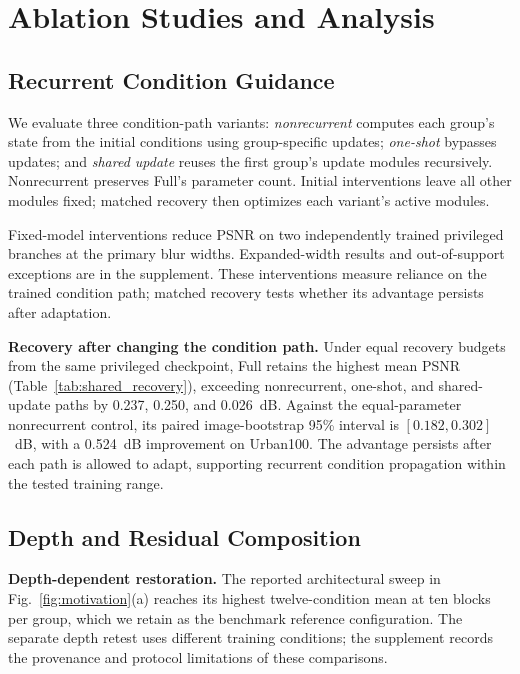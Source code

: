 \documentclass[10pt,journal,letterpaper]{IEEEtran}
\begin{document}
\section{Ablation Studies and Analysis}
\subsection{Recurrent Condition Guidance}
We evaluate three condition-path variants: \emph{nonrecurrent} computes each group's state from the initial conditions using group-specific updates; \emph{one-shot} bypasses updates; and \emph{shared update} reuses the first group's update modules recursively. Nonrecurrent preserves Full's parameter count. Initial interventions leave all other modules fixed; matched recovery then optimizes each variant's active modules.

Fixed-model interventions reduce PSNR on two independently trained privileged branches at the primary blur widths. Expanded-width results and out-of-support exceptions are in the supplement. These interventions measure reliance on the trained condition path; matched recovery tests whether its advantage persists after adaptation.

\noindent\textbf{Recovery after changing the condition path.}
Under equal recovery budgets from the same privileged checkpoint, Full retains the highest mean PSNR (Table~\ref{tab:shared_recovery}), exceeding nonrecurrent, one-shot, and shared-update paths by 0.237, 0.250, and 0.026~dB. Against the equal-parameter nonrecurrent control, its paired image-bootstrap 95\% interval is $[0.182,0.302]$~dB, with a 0.524~dB improvement on Urban100. The advantage persists after each path is allowed to adapt, supporting recurrent condition propagation within the tested training range.



\subsection{Depth and Residual Composition}
\label{sec:depth}

\noindent\textbf{Depth-dependent restoration.}
The reported architectural sweep in Fig.~\ref{fig:motivation}(a) reaches its highest twelve-condition mean at ten blocks per group, which we retain as the benchmark reference configuration. The separate depth retest uses different training conditions; the supplement records the provenance and protocol limitations of these comparisons.
\end{document}
